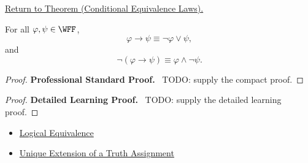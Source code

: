 \newpage
{}
\label{prf:conditional-equivalence-laws-propositional-logic}

\begin{remark*}[Return]
\hyperref[thm:conditional-equivalence-laws-propositional-logic]{Return to Theorem (Conditional Equivalence Laws).}
\end{remark*}

\begin{theorem*}
For all \(\varphi,\psi\in\WFF\),
\[
\varphi\to\psi
\equiv
\neg\varphi\lor\psi,
\]
and
\[
\neg(\varphi\to\psi)
\equiv
\varphi\land\neg\psi.
\]
\end{theorem*}

\begin{proof}
\textbf{Professional Standard Proof.}~
TODO: supply the compact proof.
\end{proof}

\begin{proof}
\textbf{Detailed Learning Proof.}~
TODO: supply the detailed learning proof.
\end{proof}

\begin{remark*}
\end{remark*}

\begin{dependencies}
\begin{itemize}
  \item \hyperref[def:logical-equivalence-propositional-logic]{Logical Equivalence}
  \item \hyperref[thm:unique-extension-truth-assignment-propositional-logic]{Unique Extension of a Truth Assignment}
\end{itemize}
\end{dependencies}

\clearpage
